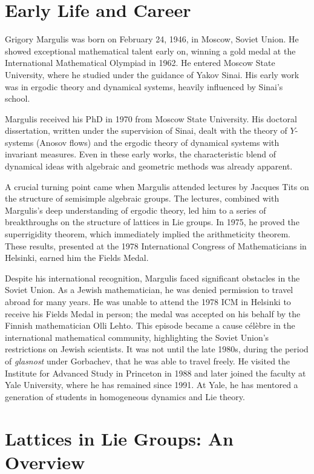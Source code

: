 \section{Early Life and Career}

Grigory Margulis was born on February 24, 1946, in Moscow, Soviet Union. He showed exceptional mathematical talent early on, winning a gold medal at the International Mathematical Olympiad in 1962. He entered Moscow State University, where he studied under the guidance of Yakov Sinai. His early work was in ergodic theory and dynamical systems, heavily influenced by Sinai's school.

Margulis received his PhD in 1970 from Moscow State University. His doctoral dissertation, written under the supervision of Sinai, dealt with the theory of \(Y\)-systems (Anosov flows) and the ergodic theory of dynamical systems with invariant measures. Even in these early works, the characteristic blend of dynamical ideas with algebraic and geometric methods was already apparent.

A crucial turning point came when Margulis attended lectures by Jacques Tits on the structure of semisimple algebraic groups. The lectures, combined with Margulis's deep understanding of ergodic theory, led him to a series of breakthroughs on the structure of lattices in Lie groups. In 1975, he proved the superrigidity theorem, which immediately implied the arithmeticity theorem. These results, presented at the 1978 International Congress of Mathematicians in Helsinki, earned him the Fields Medal.

Despite his international recognition, Margulis faced significant obstacles in the Soviet Union. As a Jewish mathematician, he was denied permission to travel abroad for many years. He was unable to attend the 1978 ICM in Helsinki to receive his Fields Medal in person; the medal was accepted on his behalf by the Finnish mathematician Olli Lehto. This episode became a cause c\'el\`ebre in the international mathematical community, highlighting the Soviet Union's restrictions on Jewish scientists. It was not until the late 1980s, during the period of \textit{glasnost} under Gorbachev, that he was able to travel freely. He visited the Institute for Advanced Study in Princeton in 1988 and later joined the faculty at Yale University, where he has remained since 1991. At Yale, he has mentored a generation of students in homogeneous dynamics and Lie theory.

\section{Lattices in Lie Groups: An Overview}

